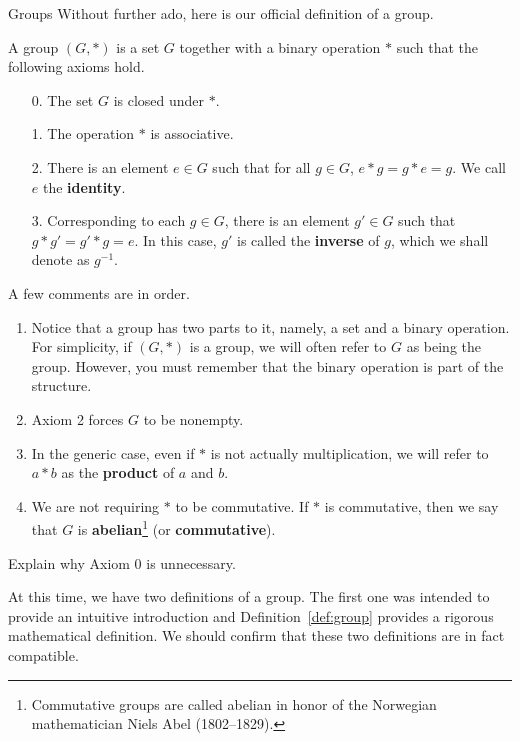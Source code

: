 \begin{section}{Groups}
Without further ado, here is our official definition of a group.

\begin{definition}\label{def:group}
A group $(G,*)$ is a set $G$ together with a binary operation $*$ such that the following axioms hold.
\begin{enumerate}
\item[0.] The set $G$ is closed under $*$.
\item[1.] The operation $*$ is associative.
\item[2.] There is an element $e\in G$ such that for all $g\in G$, $e*g=g*e=g$.  We call $e$ the \textbf{identity}.
\item[3.] Corresponding to each $g\in G$, there is an element $g'\in G$ such that $g*g'=g'*g=e$.  In this case, $g'$ is called the \textbf{inverse} of $g$, which we shall denote as $g^{-1}$.
\end{enumerate}
\end{definition}

\begin{remark}
A few comments are in order.
\begin{enumerate}
\item Notice that a group has two parts to it, namely, a set and a binary operation.  For simplicity, if $(G,*)$ is a group, we will often refer to $G$ as being the group.  However, you must remember that the binary operation is part of the structure.
\item Axiom 2 forces $G$ to be nonempty.
\item In the generic case, even if $*$ is not actually multiplication, we will refer to $a*b$ as the \textbf{product} of $a$ and $b$.
\item We are not requiring $*$ to be commutative.  If $*$ is commutative, then we say that $G$ is \textbf{abelian}\footnote{Commutative groups are called abelian in honor of the Norwegian mathematician Niels Abel (1802--1829).} (or \textbf{commutative}).
\end{enumerate}
\end{remark}

\begin{exercise}
Explain why Axiom 0 is unnecessary.
\end{exercise}

At this time, we have two definitions of a group.  The first one was intended to provide an intuitive introduction and Definition~\ref{def:group} provides a rigorous mathematical definition.  We should confirm that these two definitions are in fact compatible.


\end{section}
